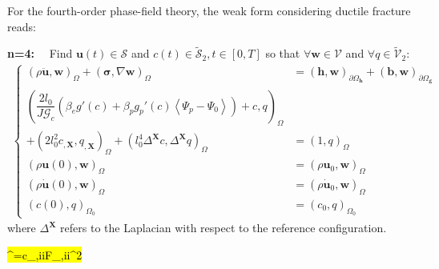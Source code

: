 For the fourth-order phase-field theory, the weak form considering ductile fracture reads:

\textbf{n=4:}$\quad$ Find $\mathbf{u}\left(t\right)\in\bm{\mathcal{S}}$ and $c\left(t\right)\in\tilde{\mathcal{S}}_{2},t\in\left[0,T\right]$ so that $\forall \mathbf{w}\in\bm{\mathcal{V}}$ and $\forall q\in\tilde{\mathcal{V}}_{2}$:
\begin{equation} \label{eq:weak_4_ductile}
\begin{aligned}
\left\{\begin{alignedat}{1}
	\left(\rho \ddot{\mathbf{u}},\mathbf{w}\right)_{\Omega} + \left(\bm{\sigma},\nabla\mathbf{w}\right)_{\Omega} &= \left(\mathbf{h},\mathbf{w}\right)_{\partial\Omega_{\mathbf{h}}} + \left(\mathbf{b},\mathbf{w}\right)_{\partial\Omega_{\mathbf{g}}} \\
	\left(\dfrac{2l_{0}}{J\mathcal{G}_{c}}\left(\beta_{e}g'\left(c\right)+\beta_{p}g_{p}'\left(c\right)\left<\Psi_{p}-\Psi_{0}\right>\right)+c,q\right)_{\Omega} & \\
	+\left(2l_{0}^{2} c_{,\mathbf{X}}, q_{,\mathbf{X}}\right)_{\Omega} + \left(l_{0}^{4}\Delta^{\mathbf{X}} c,\Delta^{\mathbf{X}} q\right)_{\Omega} &= \left(1,q\right)_{\Omega} \\
	\left(\rho\mathbf{u}\left(0\right),\mathbf{w}\right)_{\Omega} &= \left(\rho\mathbf{u}_{0},\mathbf{w}\right)_{\Omega} \\
	\left(\rho\dot{\mathbf{u}}\left(0\right),\mathbf{w}\right)_{\Omega} &= \left(\rho\dot{\mathbf{u}}_{0},\mathbf{w}\right)_{\Omega} \\
	\left(c\left(0\right),q\right)_{\Omega_{0}} &= \left(c_{0},q\right)_{\Omega_{0}}
\end{alignedat}\right.
\end{aligned}
\end{equation} 
where $\Delta^{\mathbf{X}}$ refers to the Laplacian with respect to the reference configuration. 

\hl{\Delta^{}=c_{,ii}F_{,ii}^{2} }

